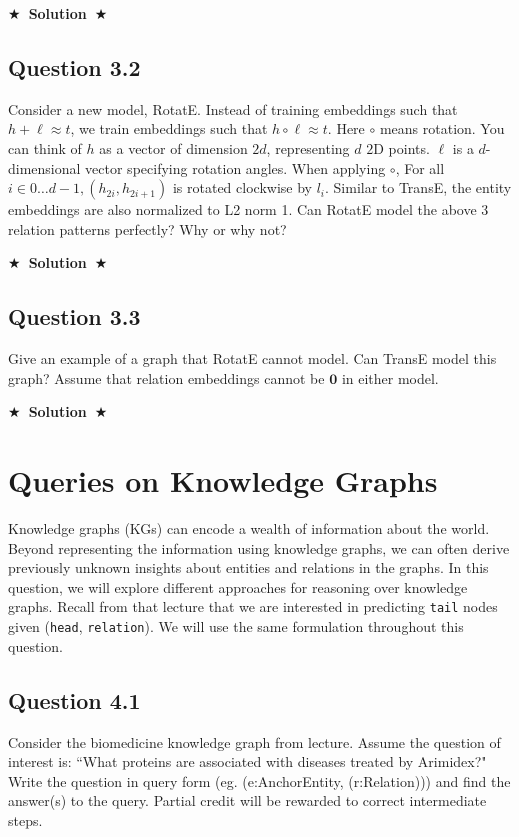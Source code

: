 \documentclass{article}
\newcommand{\Solution}[1]{{\medskip \color{black} \bf $\bigstar$~\sf \textbf{Solution}~$\bigstar$ \sf #1 } \bigskip}
\begin{document}
\Solution{}

\subsection*{Question 3.2}
Consider a new model, RotatE. Instead of training embeddings such that $h+\ell \approx t$, we train embeddings such that $h \circ \ell \approx t$. Here $\circ$ means rotation. You can think of $h$ as a vector of dimension $2 d$, representing $d$ $2 \mathrm{D}$ points. $\ell$ is a $d$-dimensional vector specifying rotation angles. When applying $\circ$, For all $i \in 0 \ldots d-1, \left(h_{2 i}, h_{2 i+1}\right)$ is rotated clockwise by $l_i$. Similar to TransE, the entity embeddings are also normalized to L2 norm 1. Can RotatE model the above 3 relation patterns perfectly? Why or why not?

\Solution{}

\subsection*{Question 3.3}
Give an example of a graph that RotatE cannot model. Can TransE model this graph? Assume that relation embeddings cannot be $\mathbf{0}$ in either model.

\Solution{}


\section{Queries on Knowledge Graphs}
Knowledge graphs (KGs) can encode a wealth of information about the world. Beyond representing the information using knowledge graphs, we can often derive previously unknown insights about entities and relations in the graphs. In this question, we will explore different approaches for reasoning over knowledge graphs. Recall from that lecture that we are interested in predicting \texttt{tail} nodes given (\texttt{head}, \texttt{relation}). We will use the same formulation throughout this question.

\subsection*{Question 4.1}
Consider the biomedicine knowledge graph from lecture. Assume the question of interest is: ``What proteins are associated with diseases treated by Arimidex?" Write the question in query form (eg. (e:AnchorEntity, (r:Relation))) and find the answer(s) to the query. Partial credit will be rewarded to correct intermediate steps.
\end{document}
